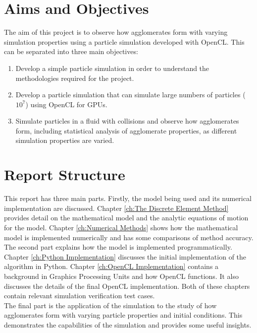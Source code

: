 \documentclass[10pt,a4paper,titlepage]{report}
\begin{document}
\section{Aims and Objectives}
The aim of this project is to observe how agglomerates form with varying simulation properties using a particle simulation developed with OpenCL. This can be separated into three main objectives:
\begin{enumerate}
\item Develop a simple particle simulation in order to understand the methodologies required for the project.
\item Develop a particle simulation that can simulate large numbers of particles ($10^7$) using OpenCL for GPUs.
\item Simulate particles in a fluid with collisions and observe how agglomerates form, including statistical analysis of agglomerate properties, as different simulation properties are varied.
\end{enumerate}
\section{Report Structure}
This report has three main parts. Firstly, the model being used and its numerical implementation are discussed. Chapter \ref{ch:The Discrete Element Method} provides detail on the mathematical model and the analytic equations of motion for the model. Chapter \ref{ch:Numerical Methods} shows how the mathematical model is implemented numerically and has some comparisons of method accuracy.
\\The second part explains how the model is implemented programmatically. Chapter \ref{ch:Python Implementation} discusses the initial implementation of the algorithm in Python. Chapter \ref{ch:OpenCL Implementation} contains a background in Graphics Processing Units and how OpenCL functions. It also discusses the details of the final OpenCL implementation. Both of these chapters contain relevant simulation verification test cases.
\\The final part is the application of the simulation to the study of how agglomerates form with varying particle properties and initial conditions. This demonstrates the capabilities of the simulation and provides some useful insights.
\end{document}
